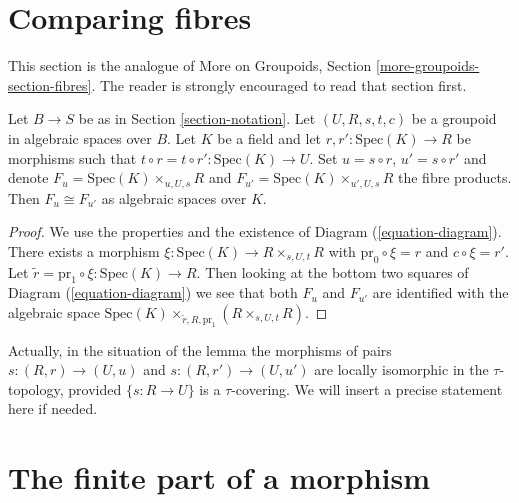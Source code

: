\section{Comparing fibres}
\label{section-fibres}

\noindent
This section is the analogue of
More on Groupoids, Section \ref{more-groupoids-section-fibres}.
The reader is strongly encouraged to read that section first.

\begin{lemma}
\label{lemma-two-fibres}
Let $B \to S$ be as in Section \ref{section-notation}.
Let $(U, R, s, t, c)$ be a groupoid in algebraic spaces over $B$.
Let $K$ be a field and let $r, r' : \text{Spec}(K) \to R$
be morphisms such that $t \circ r = t \circ r' : \text{Spec}(K) \to U$.
Set $u = s \circ r$, $u' = s \circ r'$ and denote
$F_u = \text{Spec}(K) \times_{u, U, s} R$ and
$F_{u'} = \text{Spec}(K) \times_{u', U, s} R$ the fibre products.
Then $F_u \cong F_{u'}$ as algebraic spaces over $K$.
\end{lemma}

\begin{proof}
We use the properties and the existence of
Diagram (\ref{equation-diagram}).
There exists a morphism $\xi : \text{Spec}(K) \to R \times_{s, U, t} R$
with $\text{pr}_0 \circ \xi = r$ and $c \circ \xi = r'$.
Let $\tilde r = \text{pr}_1 \circ \xi : \text{Spec}(K) \to R$.
Then looking at the bottom two squares of
Diagram (\ref{equation-diagram})
we see that both $F_u$ and $F_{u'}$ are identified with the algebraic space
$\text{Spec}(K) \times_{\tilde r, R, \text{pr}_1} (R \times_{s, U, t} R)$.
\end{proof}

\noindent
Actually, in the situation of the lemma the morphisms of pairs
$s : (R, r) \to (U, u)$ and $s : (R, r') \to (U, u')$ are
locally isomorphic in the $\tau$-topology, provided $\{s: R \to U\}$ is a
$\tau$-covering. We will insert a precise statement here if needed.




\section{The finite part of a morphism}
\label{section-finite}


